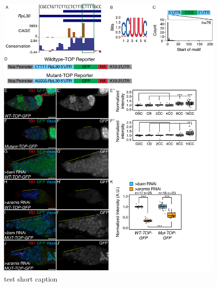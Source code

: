 \documentclass[12pt,oneside]{reedthesis}
\begin{document}
\begin{figure}

{\centering \includegraphics[width=6.5 in,height=8.9375 in]{./figure/Ribosome Biogenesis/Ribosome Biogenesis 6} 

}

\caption[test short caption]{test short caption}\label{fig:unnamed-chunk-16}
\end{figure}
\end{document}
